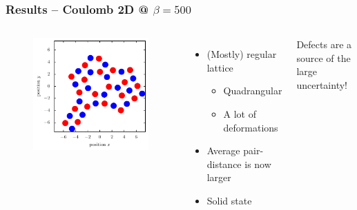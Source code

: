 \documentclass[mathserif,serif]{beamer}
\begin{document}
\begin{frame}
	\frametitle{Results -- Coulomb 2D @ $\beta=500$}
	\centering
	\begin{columns}	
	\begin{figure}
	\includegraphics[width=\textwidth]{../report/figures/Kristall_4_beta_500.pdf}
	\end{figure}
	\begin{itemize}
	\item (Mostly) regular lattice
	\begin{itemize}
		\item Quadrangular
		\item A lot of deformations
	\end{itemize}
	\item Average pair-distance is now larger
	\item Solid state
	\end{itemize}
	Defects are a source of the large uncertainty!
\end{columns}
\end{frame}
\end{document}
